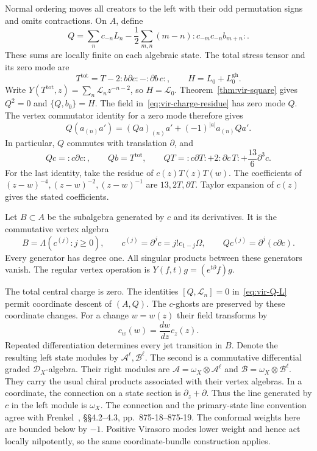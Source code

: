 Normal ordering moves all creators to the left with their odd permutation signs and omits contractions.
On $A$, define
\begin{equation}\label{eq:uc-Q}
 Q=\sum_n c_{-n}L_n
 -\frac12\sum_{m,n}(m-n):c_{-m}c_{-n}b_{m+n}:.
\end{equation}
These sums are locally finite on each algebraic state.
The total stress tensor and its zero mode are
\[
 T^{\mathrm{tot}}=T-2:b\partial c:-:\partial b\,c:,
 \qquad H=L_0+L_0^{\mathrm{gh}}.
\]
Write $Y(T^{\mathrm{tot}},z)=\sum_n\mathcal L_nz^{-n-2}$, so $H=\mathcal L_0$.
Theorem~\ref{thm:vir-square} gives $Q^2=0$ and $\{Q,b_0\}=H$.
The field in~\eqref{eq:vir-charge-residue} has zero mode $Q$.
The vertex commutator identity for a zero mode therefore gives
\begin{equation}\label{eq:uc-derivation}
 Q(a_{(n)}a')=(Qa)_{(n)}a'+(-1)^{|a|}a_{(n)}Qa'.
\end{equation}
In particular, $Q$ commutes with translation $\partial$, and
\begin{equation}\label{eq:uc-Qfields}
 Qc=:c\partial c:,
 \qquad Qb=T^{\mathrm{tot}},
 \qquad QT=:c\partial T:+2:\partial c\,T:+\frac{13}{6}\partial^3c.
\end{equation}
For the last identity, take the residue of $c(z)T(z)T(w)$.
The coefficients of $(z-w)^{-4},(z-w)^{-2},(z-w)^{-1}$ are $13,2T,\partial T$.
Taylor expansion of $c(z)$ gives the stated coefficients.

Let $B\subset A$ be the subalgebra generated by $c$ and its derivatives.
It is the commutative vertex algebra
\begin{equation}\label{eq:uc-B}
 B=\Lambda(c^{(j)}:j\geq0),\qquad
 c^{(j)}=\partial^jc=j!c_{1-j}\Omega,
 \qquad Qc^{(j)}=\partial^j(c\partial c).
\end{equation}
Every generator has degree one.
All singular products between these generators vanish.
The regular vertex operation is $Y(f,t)g=(e^{t\partial}f)g$.

The total central charge is zero.
The identities $[Q,\mathcal L_n]=0$ in~\eqref{eq:vir-Q-L} permit coordinate descent of $(A,Q)$.
The $c$-ghosts are preserved by these coordinate changes.
For a change $w=w(z)$ their field transforms by
\begin{equation}\label{eq:uc-c-transition}
 c_w(w)=\frac{dw}{dz}c_z(z).
\end{equation}
Repeated differentiation determines every jet transition in $B$.
Denote the resulting left state modules by $\mathcal A^\ell,\mathcal B^\ell$.
The second is a commutative differential graded $\mathcal D_X$-algebra.
Their right modules are $\mathcal A=\omega_X\otimes\mathcal A^\ell$ and $\mathcal B=\omega_X\otimes\mathcal B^\ell$.
They carry the usual chiral products associated with their vertex algebras.
In a coordinate, the connection on a state section is $\partial_z+\partial$.
Thus the line generated by $c$ in the left module is $\omega_X$.
The connection and the primary-state line convention agree with Frenkel~\cite{Frenkel026}, \S\S4.2--4.3, pp.~875-18--875-19.
The conformal weights here are bounded below by $-1$.
Positive Virasoro modes lower weight and hence act locally nilpotently, so the same coordinate-bundle construction applies.

